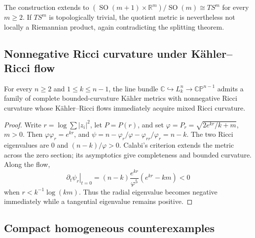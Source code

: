 \begin{remark}
\label{rem:chow-ii-higher-tangent-bundle-counterexamples}
The construction extends to
\((\operatorname{SO}(m+1)\times\mathbb R^m)/\operatorname{SO}(m)\cong TS^m\)
for every \(m\geq2\).  If \(TS^m\) is topologically trivial, the quotient
metric is nevertheless not locally a Riemannian product, again contradicting
the splitting theorem.
\end{remark}

\subsection{Nonnegative Ricci curvature under Kähler--Ricci flow}

\begin{theorem}
\label{thm:chow-ii-kahler-ricci-nonnegative-counterexample}
For every \(n\geq2\) and \(1\leq k\leq n-1\), the line bundle
\(\mathbb C\hookrightarrow L_k^n\to\mathbb{CP}^{n-1}\) admits a family of
complete bounded-curvature Kähler metrics with nonnegative Ricci curvature
whose Kähler--Ricci flows immediately acquire mixed Ricci curvature.
\end{theorem}
\begin{proof}
\sketch
Write \(r=\log\sum|z_i|^2\), let \(P=P(r)\), and set
\(\varphi=P_r=\sqrt{2e^{kr}/k+m}\), \(m>0\).  Then
\(\varphi\varphi_r=e^{kr}\), and
\(\psi=n-\varphi_r/\varphi-\varphi_{rr}/\varphi_r=n-k\).  The two Ricci
eigenvalues are \(0\) and \((n-k)/\varphi>0\).  Calabi's criterion extends
the metric across the zero section; its asymptotics give completeness and
bounded curvature.  Along the flow,
\[
 \left.\partial_t\psi_r\right|_{t=0}
 =(n-k)\frac{e^{kr}}{\varphi^5}(e^{kr}-km)<0
\]
when \(r<k^{-1}\log(km)\).  Thus the radial eigenvalue becomes negative
immediately while a tangential eigenvalue remains positive.
\end{proof}

\subsection{Compact homogeneous counterexamples}

